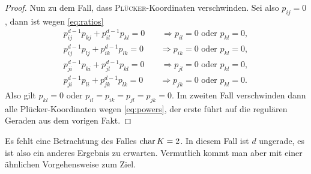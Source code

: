 \begin{proof}
Nun zu dem Fall, dass \textsc{Plücker}-Koordinaten verschwinden. Sei also $p_{ij}=0$, dann ist wegen \eqref{eq:ratios}
\begin{align*}
p_{ij}^{d-1}p_{kj} + p_{il}^{d-1}p_{kl} = 0 \qquad\Rightarrow p_{il} = 0 \text{ oder } p_{kl} = 0, \\
p_{ij}^{d-1}p_{lj} + p_{ik}^{d-1}p_{lk} = 0 \qquad\Rightarrow p_{ik} = 0 \text{ oder } p_{kl} = 0, \\
p_{ji}^{d-1}p_{ki} + p_{jl}^{d-1}p_{kl} = 0 \qquad\Rightarrow p_{jl} = 0 \text{ oder } p_{kl} = 0, \\
p_{ji}^{d-1}p_{li} + p_{jk}^{d-1}p_{lk} = 0 \qquad\Rightarrow p_{jk} = 0 \text{ oder } p_{kl} = 0.
\end{align*}
Also gilt $p_{kl} = 0$ oder $p_{il} = p_{ik} = p_{jl} = p_{jk} = 0$. Im zweiten Fall verschwinden dann alle Plücker-Koordinaten wegen \eqref{eq:powers}, der erste führt auf die regulären Geraden aus dem vorigen Fakt.
\end{proof}
\begin{remarks}
Es fehlt eine Betrachtung des Falles $\operatorname{char} K = 2$. In diesem Fall ist $d$ ungerade, es ist also ein anderes Ergebnis zu erwarten. Vermutlich kommt man aber mit einer ähnlichen Vorgehensweise zum Ziel.
\end{remarks}

